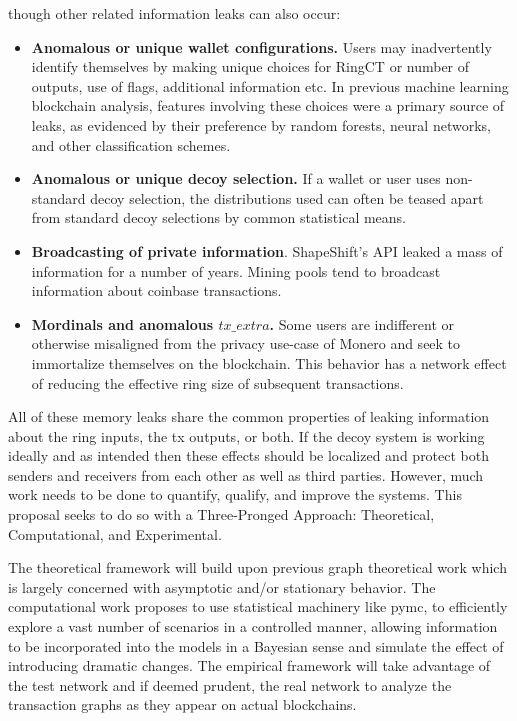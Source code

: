 \documentclass[prc, 12pt]{revtex4-1}
\begin{document}
though other related information leaks can also occur:

\begin{itemize}
  \item \textbf{Anomalous or unique wallet configurations.}   Users may inadvertently identify themselves by making unique choices for RingCT or number of outputs, use of flags, additional information etc.  In previous machine learning blockchain analysis, features involving these choices were a primary source of leaks, as evidenced by their preference by random forests, neural networks, and other classification schemes.
  \item \textbf{Anomalous or unique decoy selection.}  If a wallet or user uses non-standard decoy selection, the distributions used can often be teased apart from standard decoy selections by common statistical means.  
  \item \textbf{Broadcasting of private information}.  ShapeShift's API leaked a mass of information for a number of years.  Mining pools tend to broadcast information about coinbase transactions.
  \item \textbf{Mordinals and anomalous $tx\_extra$.}  Some users are indifferent or otherwise misaligned from the privacy use-case of Monero and seek to immortalize themselves on the blockchain.  This behavior has a network effect of reducing the effective ring size of subsequent transactions.  
\end{itemize}

All of these memory leaks share the common properties of leaking information about the ring inputs, the tx outputs, or both.  If the decoy system is working ideally and as intended then these effects should be localized and protect both senders and receivers from each other as well as third parties.  However, much work needs to be done to quantify, qualify, and improve the systems.  This proposal seeks to do so with a Three-Pronged Approach: Theoretical, Computational, and Experimental.  

The theoretical framework will build upon previous graph theoretical work which is largely concerned with asymptotic and/or stationary behavior.  The computational work proposes to use statistical machinery like pymc, to efficiently explore a vast number of scenarios in a controlled manner, allowing information to be incorporated into the models in a Bayesian sense and simulate the effect of introducing dramatic changes.  The empirical framework will take advantage of the test network and if deemed prudent, the real network to analyze the transaction graphs as they appear on actual blockchains.
\end{document}
